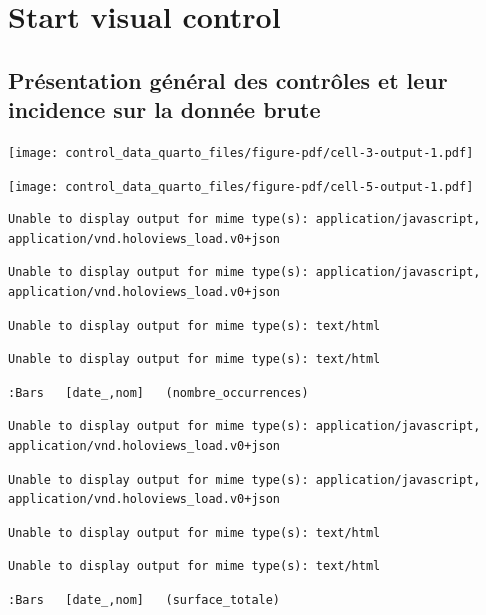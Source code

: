 \documentclass[
  11pt,
]{article}
\renewcommand*\contentsname{Table des matières}
\newcommand\contentsname{Table des matières}
\begin{document}
\renewcommand*\contentsname{Table des matières}
{
\hypersetup{linkcolor=}
\setcounter{tocdepth}{4}
\tableofcontents
}
\section{Start visual control}\label{start-visual-control}

\subsection{Présentation général des contrôles et leur incidence sur la
donnée
brute}\label{pruxe9sentation-guxe9nuxe9ral-des-contruxf4les-et-leur-incidence-sur-la-donnuxe9e-brute}

\texttt{[image: control\_data\_quarto\_files/figure-pdf/cell-3-output-1.pdf]}

\texttt{[image: control\_data\_quarto\_files/figure-pdf/cell-5-output-1.pdf]}

\begin{verbatim}
Unable to display output for mime type(s): application/javascript, application/vnd.holoviews_load.v0+json
\end{verbatim}

\begin{verbatim}
Unable to display output for mime type(s): application/javascript, application/vnd.holoviews_load.v0+json
\end{verbatim}

\begin{verbatim}
Unable to display output for mime type(s): text/html
\end{verbatim}

\begin{verbatim}
Unable to display output for mime type(s): text/html
\end{verbatim}

\begin{verbatim}
:Bars   [date_,nom]   (nombre_occurrences)
\end{verbatim}

\begin{verbatim}
Unable to display output for mime type(s): application/javascript, application/vnd.holoviews_load.v0+json
\end{verbatim}

\begin{verbatim}
Unable to display output for mime type(s): application/javascript, application/vnd.holoviews_load.v0+json
\end{verbatim}

\begin{verbatim}
Unable to display output for mime type(s): text/html
\end{verbatim}

\begin{verbatim}
Unable to display output for mime type(s): text/html
\end{verbatim}

\begin{verbatim}
:Bars   [date_,nom]   (surface_totale)
\end{verbatim}
\end{document}
